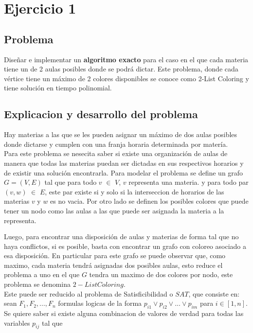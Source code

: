 \section{Ejercicio 1}
\subsection{Problema}
Dise\~nar e implementar un \textbf{algoritmo exacto} para el caso en el que cada materia tiene un
de 2 aulas posibles donde se podr\'a dictar. Este problema, donde cada v\'ertice tiene un m\'aximo de 2 colores disponibles se conoce como 2-List Coloring y tiene soluci\'on en tiempo polinomial.

\subsection{Explicacion y desarrollo del problema}     
Hay materias a las que se les pueden asignar un m\'aximo de dos aulas posibles donde dictarse y cumplen con una franja horaria determinada por mater\'ia.\\
Para este problema se nesecita saber si existe una organizaci\'on de aulas de manera que todas las materias puedan ser dictadas en sus respectivos horarios y de existir una soluci\'on encontrarla.
Para modelar el problema se define un grafo $G = (V,E)$ tal que para todo $v$ $\in$ $V$, $v$ representa una materia. y para todo par $(v,w)$ $\in$ $E$, este par existe si y solo si la interseccion de horarios de las materias $v$ y $w$ es no vacia. Por otro lado se definen los posibles colores que puede tener un nodo como las aulas a las que puede ser asignada la materia a la representa.\\

\vspace{5mm}
{\centering
 \par
}
\vspace{5mm}

Luego, para encontrar una disposici\'on de aulas y materias de forma tal que no haya conflictos, si es posible, basta con encontrar un grafo con coloreo asociado a esa disposici\'on. En particular para este grafo se puede observar que, como maximo, cada materia tendr\'a asignadas dos posibles aulas, esto reduce el problema a uno en el que $G$ tendra un maximo de dos colores por nodo, este problema se denomina $2-List Coloring$.\\

Este puede ser reducido al problema de Satisficibilidad o $SAT$, que consiste en: sean $F_1,F_2,...,F_n$ formulas logicas de la forma $p_{i1} \lor p_{i2} \lor ... \lor p_{im}$ para $i \in [1,n]$. Se quiere saber si existe alguna combinacion de valores de verdad para todas las variables $p_{ij}$ tal que \\

